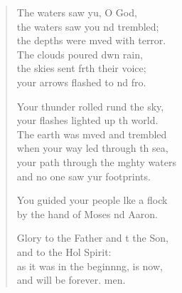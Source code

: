 \begin{verse}
\begin{patverse}
The waters saw yu, O God,\Med\\
the waters saw you nd trembled;\\
the depths were mved with terror.\Med\\
The clouds poured dwn rain,\\
the skies sent frth their voice;\Med\\
your arrows flashed to nd fro.

Your thunder rolled rund the sky,\Med\\
your flashes lighted up th world.\\
The earth was mved and trembled\Med\\
when your way led through th sea,\\
your path through the m\pointup{\i}ghty waters\Med\\
and no one saw yur footprints.

You guided your people l\pointup{\i}ke a flock\Med\\
by the hand of Moses nd Aaron.

Glory to the Father and t the Son,\Med\\
and to the Hol Spirit:\\
as it was in the beginn\pointup{\i}ng, is now,\Med\\
and will be forever. men.
  \end{patverse}
\end{verse}
